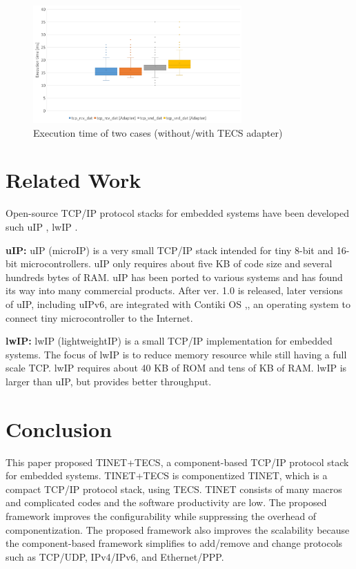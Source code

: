 \documentclass[conference]{IEEEtran/IEEEtran}
\begin{document}
\begin{figure}[t]
    \centering
    \includegraphics[width=8.0cm,clip]{figure/EvaluationOfAdapter.pdf}
    \caption{Execution time of two cases (without/with TECS adapter)}
    \label{fig:EvaluationOfAdapter}
\end{figure}


\section{Related Work}
\label{sec:Related Work}

Open-source TCP/IP protocol stacks for embedded systems have been developed such uIP \cite{par:uIP}, lwIP \cite{par:lwIP}.

{\bf uIP:}
uIP (microIP) is a very small TCP/IP stack intended for tiny 8-bit and 16-bit microcontrollers.
    uIP only requires about five KB of code size and several hundreds bytes of RAM.
uIP has been ported to various systems and has found its way into many commercial products.
After ver. 1.0 is released, later versions of uIP, including uIPv6, are integrated with Contiki OS \cite{par:Contiki},\cite{url:Contiki}, an operating system to connect tiny microcontroller to the Internet.

{\bf lwIP:}
lwIP (lightweightIP) is a small TCP/IP implementation for embedded systems.
The focus of lwIP is to reduce memory resource while still having a full scale TCP.
lwIP requires about 40 KB of ROM and tens of KB of RAM.
lwIP is larger than uIP, but provides better throughput.


\section{Conclusion}
\label{sec:Conclusion}

This paper proposed TINET+TECS, a component-based TCP/IP protocol stack for embedded systems.
TINET+TECS is componentized TINET, which is a compact TCP/IP protocol stack, using TECS.
TINET consists of many macros and complicated codes and the software productivity are low.
The proposed framework improves the configurability while suppressing the overhead of componentization.
The proposed framework also improves the scalability because the component-based framework simplifies to add/remove and change protocols such as TCP/UDP, IPv4/IPv6, and Ethernet/PPP.
\end{document}
